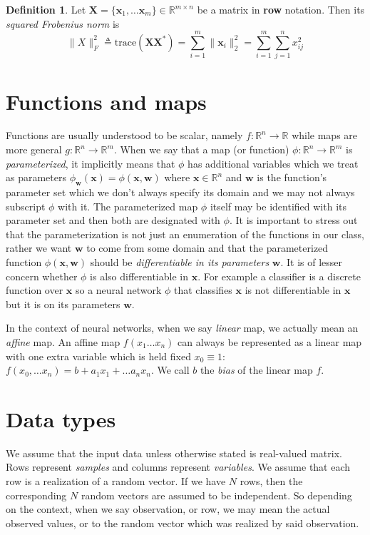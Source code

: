 \documentclass[11pt, a4paper]{report}
\theoremstyle{plain}
\theoremstyle{definition}
\newtheorem{mydef}{Definition}[chapter]
\theoremstyle{remark}
\newcommand{\R}{\mathbb{R}}
\newcommand{\X}{\mathbf{X}}
\newcommand{\x}{\mathbf{x}}
\newcommand{\w}{\mathbf{w}}
\begin{document}
\begin{mydef}
Let $\X = \{\x_1, \dots \x_m\} \in \R^{m \times n}$
be a matrix in \textbf{row} notation. Then its \emph{squared Frobenius norm} is
\begin{equation}
\label{def:frobnorm}
\|X\|_F^2 \triangleq \text{trace}(\X \X^*) 
= \sum_{i=1}^{m} \|\x_i\|^2_2 = \sum_{i=1}^m \sum_{j=1}^n x_{ij}^2
\end{equation}
\end{mydef}



\section{Functions and maps}
\label{seq:functions}
Functions are usually understood to be scalar, namely $f:\R^n \to \R$ while maps
are more general $g:\R^n \to \R^m$. When we say that a map (or function) $\phi
:\R^n \to \R^m$ is \emph{parameterized}, it implicitly means that $\phi$ has
additional variables which we treat as parameters $\phi_{\w}(\x) = \phi(\x, \w)$
where $\x \in \R^n$ and $\w$ is the function's parameter set which we don't always specify
its domain and we may not always subscript $\phi$ with it. The parameterized map
$\phi$ itself may be identified with its parameter set and then both are
designated with $\phi$.
It is important to stress out that the
parameterization is not just an enumeration of the functions in our class, rather we 
want $\w$ to come from some domain and that the parameterized function
$\phi(\x,\w)$ should be \emph{differentiable in its parameters} $\w$.
It is of lesser concern whether $\phi$ is also differentiable in $\x$.
For example a classifier is a discrete function over $\x$ so a neural network
$\phi$ that classifies $\x$ is not differentiable in $\x$ but it is on its
parameters $\w$.

In the context of neural networks, when we say \emph{linear} map, we actually
mean an \emph{affine} map. An affine map $f(x_1 \dots x_n)$ can always be
represented as a linear map with one extra variable which is held fixed $x_0
\equiv 1$: $f(x_0, \dots x_n) = b + a_1 x_1 + \dots a_n x_n$. We call $b$ the
\emph{bias} of the linear map $f$.
\label{affinelinear}

\section{Data types}
We assume that the input data unless otherwise stated is real-valued matrix.
Rows represent \emph{samples} and columns represent \emph{variables}. We assume
that each row is a realization of a random vector. If we have $N$ rows, then the
corresponding $N$ random vectors are assumed to be independent. So depending on
the context, when we say observation, or row, we may mean the actual observed
values, or to the random vector which was realized by said observation.
\end{document}
